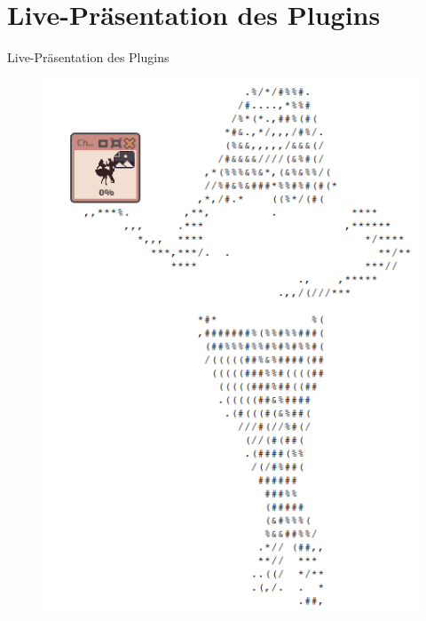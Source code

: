 \documentclass{beamer}
\begin{document}
\section{Live-Präsentation des Plugins}
\begin{frame}{Live-Präsentation des Plugins}
\begin{figure}
\center
\begin{minipage}{.45\textwidth}
\includegraphics[width=\textwidth]{figures/presenting-plugin/presenting-plugin-composition.png}
\end{minipage}
\end{figure}
\end{frame}
\end{document}
